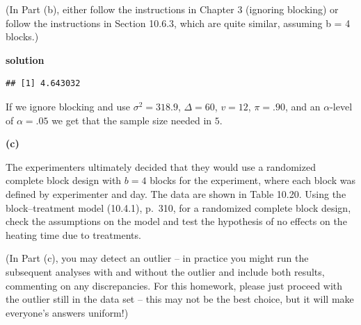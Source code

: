 \documentclass[12pt,]{article}
\newenvironment{Shaded}{\begin{snugshade}}{\end{snugshade}}
\newcommand{\KeywordTok}[1]{\textcolor[rgb]{0.13,0.29,0.53}{\textbf{#1}}}
\newcommand{\DataTypeTok}[1]{\textcolor[rgb]{0.13,0.29,0.53}{#1}}
\newcommand{\DecValTok}[1]{\textcolor[rgb]{0.00,0.00,0.81}{#1}}
\newcommand{\FloatTok}[1]{\textcolor[rgb]{0.00,0.00,0.81}{#1}}
\newcommand{\StringTok}[1]{\textcolor[rgb]{0.31,0.60,0.02}{#1}}
\newcommand{\OtherTok}[1]{\textcolor[rgb]{0.56,0.35,0.01}{#1}}
\newcommand{\ControlFlowTok}[1]{\textcolor[rgb]{0.13,0.29,0.53}{\textbf{#1}}}
\newcommand{\OperatorTok}[1]{\textcolor[rgb]{0.81,0.36,0.00}{\textbf{#1}}}
\newcommand{\NormalTok}[1]{#1}
\begin{document}
(In Part (b), either follow the instructions in Chapter 3 (ignoring
blocking) or follow the instructions in Section 10.6.3, which are quite
similar, assuming b = 4 blocks.)

\textbf{solution}

\begin{Shaded}
\end{Shaded}

\begin{verbatim}
## [1] 4.643032
\end{verbatim}

If we ignore blocking and use \(\sigma^2 = 318.9\), \(\Delta = 60\),
\(v=12\), \(\pi = .90\), and an \(\alpha\)-level of \(\alpha =.05\) we
get that the sample size needed in \(5\).

\textbf{(c)}

The experimenters ultimately decided that they would use a randomized
complete block design with \(b = 4\) blocks for the experiment, where
each block was defined by experimenter and day. The data are shown in
Table 10.20. Using the block--treatment model (10.4.1), p.~310, for a
randomized complete block design, check the assumptions on the model and
test the hypothesis of no effects on the heating time due to treatments.

(In Part (c), you may detect an outlier -- in practice you might run the
subsequent analyses with and without the outlier and include both
results, commenting on any discrepancies. For this homework, please just
proceed with the outlier still in the data set -- this may not be the
best choice, but it will make everyone's answers uniform!)
\end{document}
